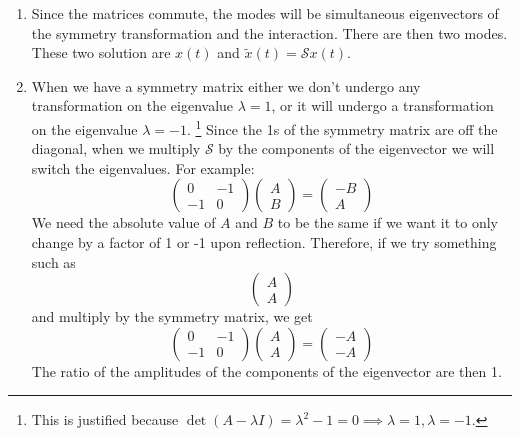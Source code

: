 \begin{sol}
\begin{enumerate}[label=\textbf{(\alph*)}] 
\item Since the matrices commute, the modes will be simultaneous eigenvectors of the symmetry transformation and the interaction. There are then two modes. These two solution are $x(t)$ and $\tilde{x}(t) = \mathcal{S}x(t)$.

\item When we have a symmetry matrix either we don't undergo any transformation on the eigenvalue $\lambda = 1$, or it will undergo a transformation on the eigenvalue $\lambda = -1$. \footnote{
This is justified because $\det (A - \lambda I) = \lambda^2 - 1 = 0\implies \lambda = 1, \lambda = -1$.}
Since the 1s of the symmetry matrix are off the diagonal, when we multiply $\mathcal{S}$ by the components of the eigenvector we will switch the eigenvalues. For example:
\[
\begin{pmatrix}
0 & -1 \\
-1 & 0
\end{pmatrix}
\begin{pmatrix}
A \\
B
\end{pmatrix}
=
\begin{pmatrix}
-B \\
A
\end{pmatrix}
\]
We need the absolute value of $A$ and $B$ to be the same if we want it to only change by a factor of 1 or -1 upon reflection. Therefore, if we try something such as 
\[
\begin{pmatrix}
A \\
A
\end{pmatrix}
\]
and multiply by the symmetry matrix, we get 
\[
\begin{pmatrix}
0 & -1 \\
-1 & 0
\end{pmatrix}
\begin{pmatrix}
A \\
A
\end{pmatrix}
=
\begin{pmatrix}
-A \\
-A
\end{pmatrix}
\]
The ratio of the amplitudes of the components of the eigenvector are then 1.
\end{enumerate}
\end{sol}